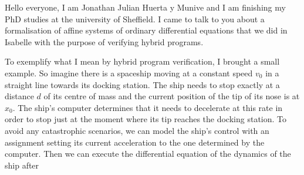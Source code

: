 \documentclass[english,letterpaper,12pt]{article}
\begin{document}

Hello everyone, I am Jonathan Julian Huerta y Munive and I am finishing my PhD studies at the university of Sheffield. I came to talk to you about a formalisation of affine systems of ordinary differential equations that we did in Isabelle with the purpose of verifying hybrid programs.

To exemplify what I mean by hybrid program verification, I brought a small example. So imagine there is a spaceship moving at a constant speed $v_0$ in a straight line towards its docking station. The ship needs to stop exactly at a distance $d$ of its centre of mass and the current position of the tip of its nose is at $x_0$. The ship's computer determines that it needs to decelerate at this rate in order to stop just at the moment where its tip reaches the docking station. To avoid any catastrophic scenarios, we can model the ship's control with an assignment setting its current acceleration to the one determined by the computer. Then we can execute the differential equation of the dynamics of the ship after

\end{document}

